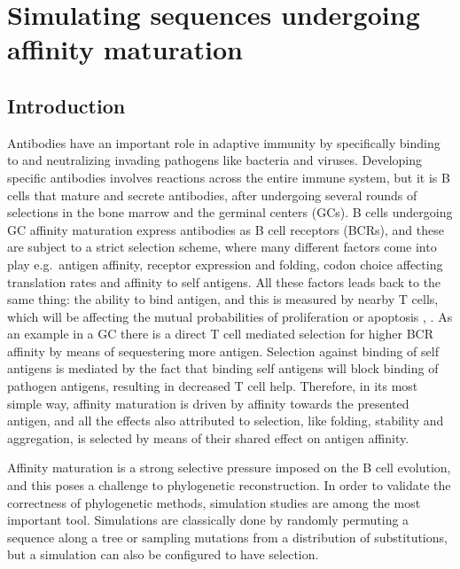 \chapter{Simulating sequences undergoing affinity maturation}

\section{Introduction}
Antibodies have an important role in adaptive immunity by specifically binding to and neutralizing invading pathogens like bacteria and viruses.
Developing specific antibodies involves reactions across the entire immune system, but it is B cells that mature and secrete antibodies, after undergoing several rounds of selections in the bone marrow and the germinal centers (GCs).
B cells undergoing GC affinity maturation express antibodies as B cell receptors (BCRs), and these are subject to a strict selection scheme, where many different factors come into play e.g.\ antigen affinity, receptor expression and folding, codon choice affecting translation rates and affinity to self antigens.
All these factors leads back to the same thing: the ability to bind antigen, and this is measured by nearby T cells, which will be affecting the mutual probabilities of proliferation or apoptosis \cite{Bannard_Cyster_2017}, \cite{victora2012germinal}.
As an example in a GC there is a direct T cell mediated selection for higher BCR affinity by means of sequestering more antigen.
Selection against binding of self antigens is mediated by the fact that binding self antigens will block binding of pathogen antigens, resulting in decreased T cell help.
Therefore, in its most simple way, affinity maturation is driven by affinity towards the presented antigen, and all the effects also attributed to selection, like folding, stability and aggregation, is selected by means of their shared effect on antigen affinity.

Affinity maturation is a strong selective pressure imposed on the B cell evolution, and this poses a challenge to phylogenetic reconstruction.
In order to validate the correctness of phylogenetic methods, simulation studies are among the most important tool.
Simulations are classically done by randomly permuting a sequence along a tree or sampling mutations from a distribution of substitutions, but a simulation can also be configured to have selection.

